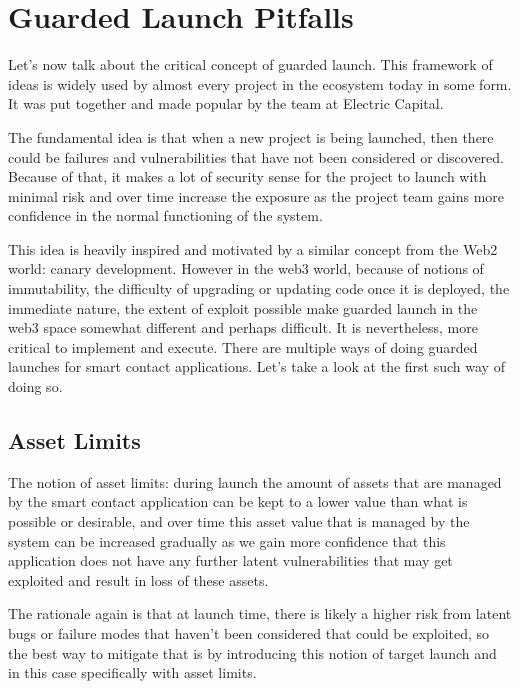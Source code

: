 \section{Guarded Launch Pitfalls}\label{guarded-launch-pitfalls}

Let's now talk about the critical concept of guarded launch. This
framework of ideas is widely used by almost every project in the
ecosystem today in some form. It was put together and made popular by
the team at Electric Capital.

The fundamental idea is that when a new project is being launched, then
there could be failures and vulnerabilities that have not been
considered or discovered. Because of that, it makes a lot of security
sense for the project to launch with minimal risk and over time increase
the exposure as the project team gains more confidence in the normal
functioning of the system.

This idea is heavily inspired and motivated by a similar concept from
the Web2 world: canary development. However in the web3 world, because
of notions of immutability, the difficulty of upgrading or updating code
once it is deployed, the immediate nature, the extent of exploit
possible make guarded launch in the web3 space somewhat different and
perhaps difficult. It is nevertheless, more critical to implement and
execute. There are multiple ways of doing guarded launches for smart
contact applications. Let's take a look at the first such way of doing
so.

\subsection{Asset Limits}\label{asset-limits}

The notion of asset limits: during launch the amount of assets that are
managed by the smart contact application can be kept to a lower value
than what is possible or desirable, and over time this asset value that
is managed by the system can be increased gradually as we gain more
confidence that this application does not have any further latent
vulnerabilities that may get exploited and result in loss of these
assets.

The rationale again is that at launch time, there is likely a higher
risk from latent bugs or failure modes that haven't been considered that
could be exploited, so the best way to mitigate that is by introducing
this notion of target launch and in this case specifically with asset
limits.

